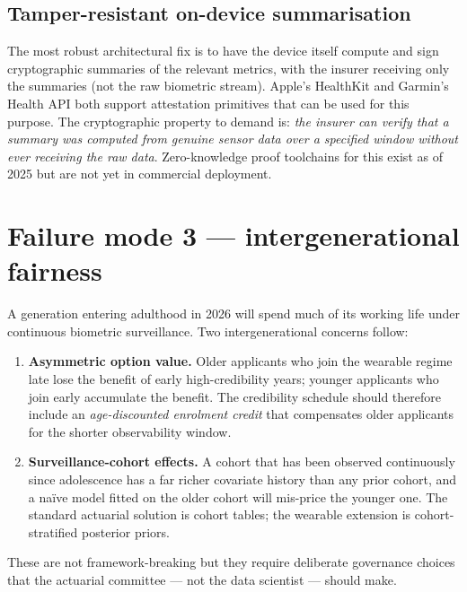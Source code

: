 \documentclass[11pt,a4paper]{article}
\let\origsection\section
\renewcommand{\section}{\clearpage\origsection}
\theoremstyle{ia}
\newcommand{\1}{\mathbf{1}}
\begin{document}
\subsection{Tamper-resistant on-device summarisation}\label{ss:tamper}

The most robust architectural fix is to have the device itself
compute and sign cryptographic summaries of the relevant metrics,
with the insurer receiving only the summaries (not the raw
biometric stream). Apple's HealthKit and Garmin's Health API both
support attestation primitives that can be used for this purpose.
The cryptographic property to demand is: \emph{the insurer can
verify that a summary was computed from genuine sensor data over a
specified window without ever receiving the raw data}. Zero-knowledge
proof toolchains for this exist as of 2025 \citep{ZKHealth2024} but
are not yet in commercial deployment.

\section{Failure mode 3 --- intergenerational fairness}\label{sec:fairness}

A generation entering adulthood in 2026 will spend much of its
working life under continuous biometric surveillance. Two
intergenerational concerns follow:

\begin{enumerate}[leftmargin=*,nosep,topsep=4pt]
   \item \textbf{Asymmetric option value.} Older applicants who
         join the wearable regime late lose the benefit of early
         high-credibility years; younger applicants who join early
         accumulate the benefit. The credibility schedule should
         therefore include an \emph{age-discounted enrolment
         credit} that compensates older applicants for the
         shorter observability window.
   \item \textbf{Surveillance-cohort effects.} A cohort that has
         been observed continuously since adolescence has a far
         richer covariate history than any prior cohort, and a
         na\"ive model fitted on the older cohort will mis-price the
         younger one. The standard actuarial solution is cohort
         tables; the wearable extension is cohort-stratified
         posterior priors.
\end{enumerate}

These are not framework-breaking but they require deliberate
governance choices that the actuarial committee --- not the data
scientist --- should make.
\end{document}
